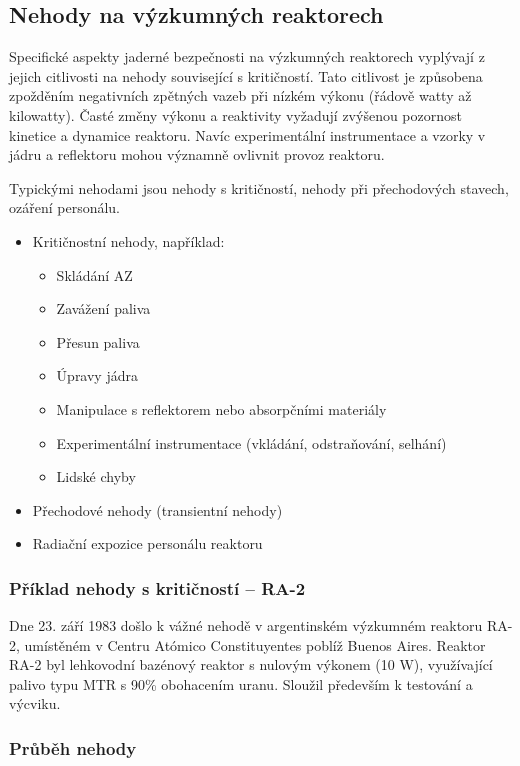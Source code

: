 \subsection{Nehody na výzkumných reaktorech}

Specifické aspekty jaderné bezpečnosti na výzkumných reaktorech vyplývají z jejich citlivosti na nehody související s kritičností. Tato citlivost je způsobena zpožděním negativních zpětných vazeb při nízkém výkonu (řádově watty až kilowatty). Časté změny výkonu a reaktivity vyžadují zvýšenou pozornost kinetice a dynamice reaktoru. Navíc experimentální instrumentace a vzorky v jádru a reflektoru mohou významně ovlivnit provoz reaktoru.

Typickými nehodami jsou nehody s kritičností, nehody při přechodových stavech, ozáření personálu.

\begin{itemize}
    \item Kritičnostní nehody, například:
        \begin{itemize}
            \item Skládání AZ
            \item Zavážení paliva
            \item Přesun paliva
            \item Úpravy jádra
            \item Manipulace s reflektorem nebo absorpčními materiály
            \item Experimentální instrumentace (vkládání, odstraňování, selhání)
            \item Lidské chyby
        \end{itemize}
    \item Přechodové nehody (transientní nehody)
    \item Radiační expozice personálu reaktoru
\end{itemize}

\subsubsection{Příklad nehody s kritičností -- RA-2}

Dne 23. září 1983 došlo k vážné nehodě v argentinském výzkumném reaktoru RA-2, umístěném v Centru Atómico Constituyentes poblíž Buenos Aires. Reaktor RA-2 byl lehkovodní bazénový reaktor s nulovým výkonem (10 W), využívající palivo typu MTR s 90\% obohacením uranu. Sloužil především k testování a výcviku.

\subsubsection*{Průběh nehody}

